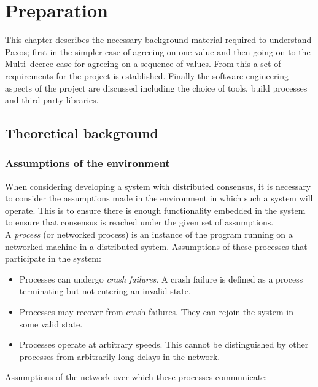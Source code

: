 \chapter{Preparation}

This chapter describes the necessary background material required to understand Paxos; first in the simpler case of agreeing on one value and then going on to the Multi--decree case for agreeing on a sequence of values. From this a set of requirements for the project is established. Finally the software engineering aspects of the project are discussed including the choice of tools, build processes and third party libraries.

\section{Theoretical background}

\subsection{Assumptions of the environment}
\label{section-assumptions}
When considering developing a system with distributed consensus, it is necessary to consider the assumptions made in the environment in which such a system will operate. This is to ensure there is enough functionality embedded in the system to ensure that consensus is reached under the given set of assumptions. \\

A \emph{process} (or networked process) is an instance of the program running on a networked machine in a distributed system. Assumptions of these processes that participate in the system:

\begin{itemize}
  \item Processes can undergo \emph{crash failures}. A crash failure is defined as a process terminating but not entering an invalid state.
  \item Processes may recover from crash failures. They can rejoin the system in some valid state. 
  \item Processes operate at arbitrary speeds. This cannot be distinguished by other processes from arbitrarily long delays in the network.
\end{itemize}

Assumptions of the network over which these processes communicate:

